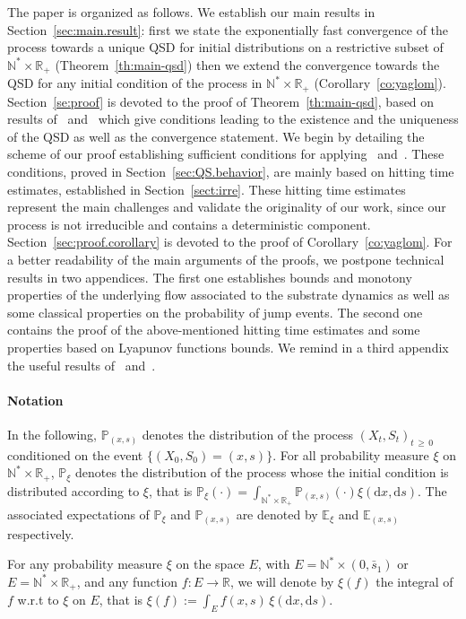 \documentclass[AHL,Unicode,longabstracts,published]{cedram}
\newcommand{\PP}{\mathbb{P}}
\newcommand{\RR}{\mathbb{R}}
\newcommand{\NN}{\mathbb{N}}
\newcommand{\EE}{\mathbb{E}}
\newcommand{\dif}{\mathrm{d}}
\newcommand{\1}{\mathbf{1}}
\begin{document}
The paper is organized as follows. We establish our main results in Section~\ref{sec:main.result}: first we state the exponentially fast convergence of the process towards a unique QSD for initial distributions on a restrictive subset of $\NN^*\times \RR_+$ (Theorem~\ref{th:main-qsd}) then we extend the convergence towards the QSD for any initial condition of the process in $\NN^*\times \RR_+$ (Corollary~\ref{co:yaglom}). Section~\ref{se:proof} is devoted to the proof of Theorem~\ref{th:main-qsd}, based on results of~\cite{BCGM} and~\cite{CV20} which give conditions leading to the existence and the uniqueness of the QSD as well as the convergence statement. We begin by detailing the scheme of our proof establishing sufficient conditions for applying~\cite{BCGM} and~\cite{CV20}. These conditions, proved in Section~\ref{sec:QS.behavior}, are mainly based on hitting time estimates, established in Section~\ref{sect:irre}. These hitting time estimates represent the main challenges and validate the originality of our work, since our process is not irreducible and contains a deterministic component. Section~\ref{sec:proof.corollary} is devoted to the proof of Corollary~\ref{co:yaglom}. For a better readability of the main arguments of the proofs, we postpone technical results in two appendices. The first one establishes bounds and monotony properties of the underlying flow associated to the substrate dynamics as well as some classical properties on the probability of jump events. The second one contains the proof of the above-mentioned hitting time estimates and some properties based on Lyapunov functions bounds. We remind in a third appendix the useful results of~\cite{BCGM} and~\cite{CV20}.



\paragraph{Notation}
In the following, $\PP_{(x,s)}$ denotes the distribution of the process $(X_t,S_t)_{t\,\geq\,0}$ conditioned on the event $\{ (X_0,S_0) = (x,s)\}$. For all probability measure $\xi$ on $\NN^*\times \RR_+$, $\PP_\xi $ denotes the distribution of the process whose the initial condition is distributed according to $\xi$, that is $\PP_\xi (\cdot) = \int_{\NN^*\times \RR_+} \PP_{(x,s)} (\cdot) \xi(\dif x,\dif s)$. The associated expectations of $\PP_\xi $ and $\PP_{(x,s)}$ are denoted by $\EE_{\xi}$ and $\EE_{(x,s)}$ respectively.

For any probability measure $\xi$ on the space $E$, with $E=\NN^*\times (0, \bar s_1)$ or $E=\NN^*\times \RR_+$, and any function $f:E\to\RR$, we will denote by $\xi(f)$ the integral of $f$ w.r.t to $\xi$ on $E$, that is $\xi(f):=\int_E f(x,s)\,\xi(\dif x, \dif s)$.
\end{document}
